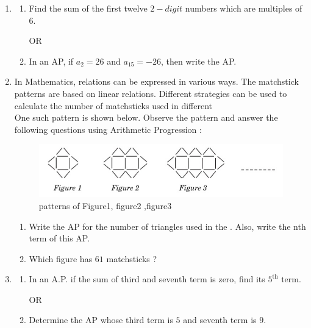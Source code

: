 \documentclass{article}
\begin{document}
\begin{enumerate}
    \item 
    \begin{enumerate}
        \item Find the sum of the first twelve $2-digit$ numbers which are 
multiples of $6$.
        \begin{center}
            OR
        \end{center} 
        \item In an AP, if $a_2=26$ and $a _ {15} = -26$, then write the AP.
        \end{enumerate}
        \item In Mathematics, relations can be expressed in various ways. The 
matchstick patterns are based on linear relations. Different strategies 
can be used to calculate the number of matchsticks used in different 
 \\One such pattern is shown below. Observe the pattern and answer the 
following questions using Arithmetic Progression :
\begin{figure}[H]
    \centering
	\includegraphics[width=\columnwidth]{figs/ap.jpg}
	\caption{patterns of Figure1, figure2 ,figure3}
    \label{fig:ap}
\end{figure}
    \begin{enumerate}
	    \item Write the AP for the number of triangles used in the . Also, 
write the nth term of this AP.
\item Which figure has $61$ matchsticks ? 
    \end{enumerate} 

    \item 
    \begin{enumerate}
        \item In an A.P. if the sum of third and seventh term is zero, find its $5^{\text{th}}$ term.
        \begin{center}
            OR
        \end{center} 
        \item Determine the AP whose third term is $5$ and seventh term is $9$.
        \end{enumerate}


\end{enumerate}
\end{document}
